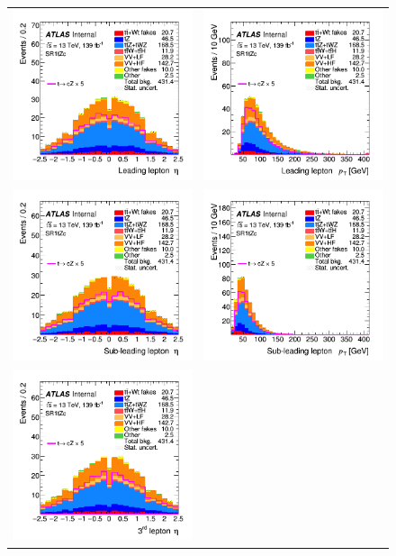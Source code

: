 \begin{figure}[!htbp]
	\centering
	\begin{tabular}{cc}
		\includegraphics[width=.35\textwidth]{Appendices/AP6/figures/SR1/lep1_eta} &
		\includegraphics[width=.35\textwidth]{Appendices/AP6/figures/SR1/lep1_pt} \\
		\includegraphics[width=.35\textwidth]{Appendices/AP6/figures/SR1/lep2_eta} &
		\includegraphics[width=.35\textwidth]{Appendices/AP6/figures/SR1/lep2_pt} \\
		\includegraphics[width=.35\textwidth]{Appendices/AP6/figures/SR1/lep3_eta} &

\end{tabular}
\end{figure}
